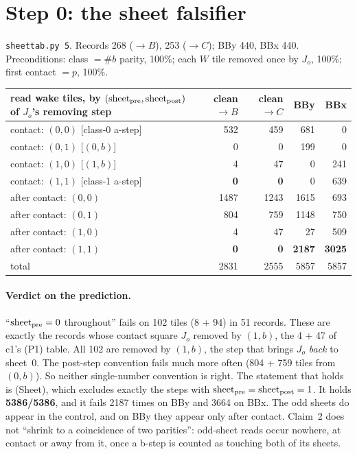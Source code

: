 \documentclass[11pt]{article}
\theoremstyle{definition}\newtheorem{definition}[theorem]{Definition}\newtheorem{remark}[theorem]{Remark}
\begin{document}
\section{Step 0: the sheet falsifier}\label{sec:step0}
\texttt{sheettab.py 5}. Records 268 ($\to B$), 253 ($\to C$); BBy 440, BBx 440. Preconditions: class $=\#b$ parity, 100\%; each $W$ tile removed once by $J_o$, 100\%; first contact $=p$, 100\%.
\begin{center}\begin{tabular}{lrrrr}\toprule
read wake tiles, by $(\mathrm{sheet}_{\rm pre},\mathrm{sheet}_{\rm post})$ of $J_o$'s removing step & clean$\to B$ & clean$\to C$ & BBy & BBx\\\midrule
contact: $(0,0)$ [class-0 a-step] & 532 & 459 & 681 & 0\\
contact: $(0,1)$ [$(0,b)$] & 0 & 0 & 199 & 0\\
contact: $(1,0)$ [$(1,b)$] & 4 & 47 & 0 & 241\\
contact: $(1,1)$ [class-1 a-step] & \textbf{0} & \textbf{0} & 0 & 639\\
after contact: $(0,0)$ & 1487 & 1243 & 1615 & 693\\
after contact: $(0,1)$ & 804 & 759 & 1148 & 750\\
after contact: $(1,0)$ & 4 & 47 & 27 & 509\\
after contact: $(1,1)$ & \textbf{0} & \textbf{0} & \textbf{2187} & \textbf{3025}\\\midrule
total & 2831 & 2555 & 5857 & 5857\\\bottomrule
\end{tabular}\end{center}
\paragraph{Verdict on the prediction.} ``$\mathrm{sheet}_{\rm pre}=0$ throughout'' fails on 102 tiles (8 + 94) in 51 records. These are exactly the records whose contact square $J_o$ removed by $(1,b)$, the 4 + 47 of c1's (P1) table. All 102 are removed by $(1,b)$, the step that brings $J_o$ \emph{back} to sheet~0. The post-step convention fails much more often (804 + 759 tiles from $(0,b)$).
So neither single-number convention is right. The statement that holds is (Sheet), which excludes exactly the steps with $\mathrm{sheet}_{\rm pre}=\mathrm{sheet}_{\rm post}=1$. It holds \textbf{5386/5386}, and it fails 2187 times on BBy and 3664 on BBx. The odd sheets do appear in the control, and on BBy they appear only after contact.
Claim~2 does not ``shrink to a coincidence of two parities'': odd-sheet reads occur nowhere, at contact or away from it, once a b-step is counted as touching both of its sheets.
\end{document}
